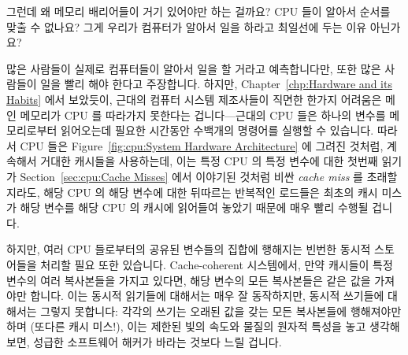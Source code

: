 그런데 왜 메모리 배리어들이 거기 있어야만 하는 걸까요?
CPU 들이 알아서 순서를 맞출 수 없나요?
그게 우리가 컴퓨터가 알아서 일을 하라고 최일선에 두는 이유 아닌가요?

많은 사람들이 실제로 컴퓨터들이 알아서 일을 할 거라고 예측합니다만, 또한 많은
사람들이 일을 빨리 해야 한다고 주장합니다.
하지만, Chapter~\ref{chp:Hardware and its Habits} 에서 보았듯이, 근대의 컴퓨터
시스템 제조사들이 직면한 한가지 어려움은 메인 메모리가 CPU 를 따라가지 못한다는
겁니다---근대의 CPU 들은 하나의 변수를 메모리로부터 읽어오는데 필요한 시간동안
수백개의 명령어를 실행할 수 있습니다.
따라서 CPU 들은 Figure~\ref{fig:cpu:System Hardware Architecture}
에 그려진 것처럼, 계속해서 거대한 캐시들을 사용하는데, 이는 특정 CPU 의 특정
변수에 대한 첫번째 읽기가 Section~\ref{sec:cpu:Cache Misses} 에서 이야기된
것처럼 비싼 \emph{cache miss} 를 초래할지라도, 해당 CPU 의 해당 변수에 대한
뒤따르는 반복적인 로드들은 최초의 캐시 미스가 해당 변수를 해당 CPU 의 캐시에
읽어들여 놓았기 때문에 매우 빨리 수행될 겁니다.

하지만, 여러 CPU 들로부터의 공유된 변수들의 집합에 행해지는 빈번한 동시적
스토어들을 처리할 필요 또한 있습니다.
Cache-coherent 시스템에서, 만약 캐시들이 특정 변수의 여러 복사본들을 가지고
있다면, 해당 변수의 모든 복사본들은 같은 값을 가져야만 합니다.
이는 동시적 읽기들에 대해서는 매우 잘 동작하지만, 동시적 쓰기들에 대해서는
그렇지 못합니다: 각각의 쓰기는 오래된 값을 갖는 모든 복사본들에 행해져야만 하며
(또다른 캐시 미스!), 이는 제한된 빛의 속도와 물질의 원자적 특성을 놓고 생각해
보면, 성급한 소프트웨어 해커가 바라는 것보다 느릴 겁니다.
\iffalse


